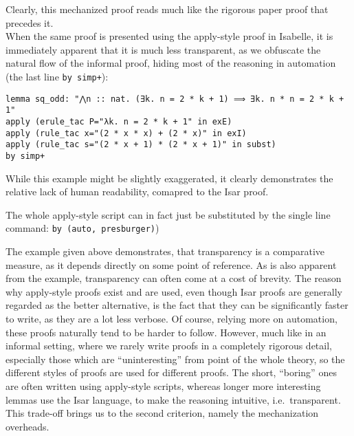 \documentclass[a4paper, 12pt, twoside]{style/ociamthesis}
\theoremstyle{plain}
\theoremstyle{definition}
\newtheorem{Example}{Example}[chapter]
\theoremstyle{remark}
\newtheorem*{Note}{Note}
\renewenvironment{Example}{\begin{OldExample}\begin{mdframed}[style=example, linecolor=yellow]}{\end{mdframed}\end{OldExample}}
\renewenvironment{Note}{\begin{OldNote}\begin{mdframed}[style=example, linecolor=black]}{\end{mdframed}\end{OldNote}}
\begin{document}
\begin{Example}
Clearly, this mechanized proof reads much like the rigorous paper proof
that precedes it.\\
When the same proof is presented using the apply-style proof in
Isabelle, it is immediately apparent that it is much less transparent,
as we obfuscate the natural flow of the informal proof, hiding most of
the reasoning in automation (the last line \texttt{by simp+}):

\begin{verbatim}
lemma sq_odd: "⋀n :: nat. (∃k. n = 2 * k + 1) ⟹ ∃k. n * n = 2 * k + 1"
apply (erule_tac P="λk. n = 2 * k + 1" in exE)
apply (rule_tac x="(2 * x * x) + (2 * x)" in exI)
apply (rule_tac s="(2 * x + 1) * (2 * x + 1)" in subst)
by simp+
\end{verbatim}

While this example might be slightly exaggerated, it clearly
demonstrates the relative lack of human readability, comapred to the
Isar proof.\\
\(\ \)

\begin{Note}

The whole apply-style script can in fact just be substituted by the
single line command: \texttt{by (auto, presburger)})

\end{Note}

\end{Example}

The example given above demonstrates, that transparency is a comparative
measure, as it depends directly on some point of reference. As is also
apparent from the example, transparency can often come at a cost of
brevity. The reason why apply-style proofs exist and are used, even
though Isar proofs are generally regarded as the better alternative, is
the fact that they can be significantly faster to write, as they are a
lot less verbose. Of course, relying more on automation, these proofs
naturally tend to be harder to follow. However, much like in an informal
setting, where we rarely write proofs in a completely rigorous detail,
especially those which are ``uninteresting'' from point of the whole
theory, so the different styles of proofs are used for different proofs.
The short, ``boring'' ones are often written using apply-style scripts,
whereas longer more interesting lemmas use the Isar language, to make
the reasoning intuitive, i.e.~transparent.\\
This trade-off brings us to the second criterion, namely the
mechanization overheads.
\end{document}
